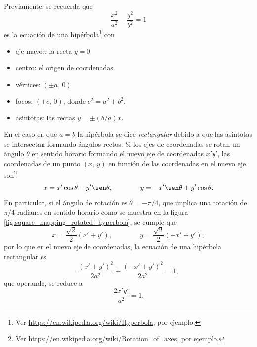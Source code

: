 \documentclass[a4paper]{report}
\begin{document}
Previamente, se recuerda que 
\begin{equation}\label{eq:hyperbola_canonical_equation}
 \frac{x^2}{a^2}-\frac{y^2}{b^2}=1 
\end{equation}
es la ecuación de una hipérbola\footnote{Ver \url{https://en.wikipedia.org/wiki/Hyperbola}, por ejemplo.} con 
\begin{itemize}
 \item eje mayor: la recta \(y=0\)
 \item centro: el origen de coordenadas
 \item vértices: \((\pm a,\,0)\)
 \item focos: \((\pm c,\,0)\), donde \(c^2=a^2+b^2\).
 \item asíntotas: las rectas \(y=\pm (b/a)x\).
\end{itemize}
En el caso en que \(a=b\) la hipérbola se dice \emph{rectangular} debido a que las asíntotas se intersectan formando ángulos rectos. Si los ejes de coordenadas se rotan un ángulo \(\theta\) en sentido horario formando el nuevo eje de coordenadas \(x'y'\), las coordenadas de un punto \((x,\,y)\) en función de las coordenadas en el nuevo eje son\footnote{Ver \url{https://en.wikipedia.org/wiki/Rotation_of_axes}, por ejemplo.}
\[
  x=x'\cos\theta-y'\sen\theta,\qquad\qquad
  y=-x'\sen\theta+y'\cos\theta.
\]
En particular, si el ángulo de rotación es \(\theta=-\pi/4\), que implica una rotación de \(\pi/4\) radianes en sentido horario como se muestra en la figura \ref{fig:square_mapping_rotated_hyperbola}, se cumple que
\[
 x=\frac{\sqrt{2}}{2}\left(x'+y'\right),\qquad\qquad
 y=\frac{\sqrt{2}}{2}\left(-x'+y'\right),
\]
por lo que en el nuevo eje de coordenadas, la ecuación de una hipérbola rectangular es
\[
 \frac{(x'+y')^2}{2a^2}+\frac{(-x'+y')^2}{2a^2}=1,
\]
que operando, se reduce a 
\begin{equation}\label{eq:rectangular_hyperbola_1st_3rd_quadrant_equation}
 \frac{2x'y'}{a^2}=1.
\end{equation}
\end{document}
